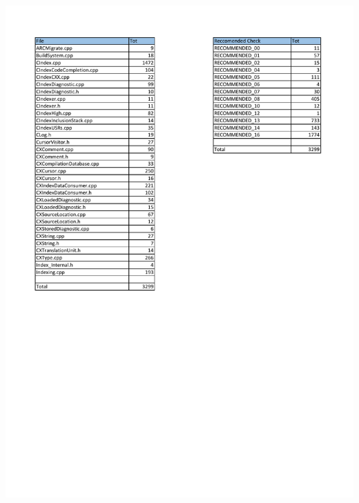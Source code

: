 \pagebreak

\begin{minipage}{\linewidth}
	\includegraphics[width=\textwidth]{pdf/SciTools_Summary.pdf}
\end{minipage}

\pagebreak

